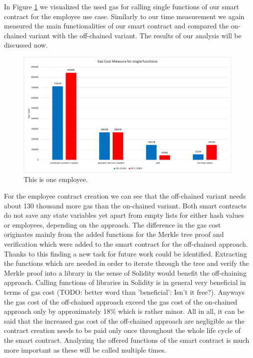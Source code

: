 In Figure \ref{fig:05_gas_cost_single} we visualized the used gas for calling single functions of our smart contract for the employee use case. Similarly to our time measurement we again measured the main functionalities of our smart contract and compared the on-chained variant with the off-chained variant. The results of our analysis will be discussed now.

\begin{figure}[t]
\centering
\includegraphics[width=1.0\textwidth]{images/05_evaluation/05_gas_cost_single.png}
\caption{\label{fig:05_gas_cost_single}This is one employee.}
\end{figure}

For the employee contract creation we can see that the off-chained variant needs about 130 thousand more gas than the on-chained variant. Both smart contracts do not save any state variables yet apart from empty lists for either hash values or employees, depending on the approach. The difference in the gas cost originates mainly from the added functions for the Merkle tree proof and verification which were added to the smart contract for the off-chained approach. Thanks to this finding a new task for future work could be identified. Extracting the functions which are needed in order to iterate through the tree and verify the Merkle proof into a library in the sense of Solidity would benefit the off-chaining approach. Calling functions of libraries in Solidity is in general very beneficial in terms of gas cost (TODO: better word than 'beneficial': Isn't it free?). Anyways the gas cost of the off-chained approach exceed the gas cost of the on-chained approach only by approximately 18\% which is rather minor. All in all, it can be said that the increased gas cost of the off-chained approach are negligible as the contract creation needs to be paid only once throughout the whole life cycle of the smart contract. Analyzing the offered functions of the smart contract is much more important as these will be called multiple times.

